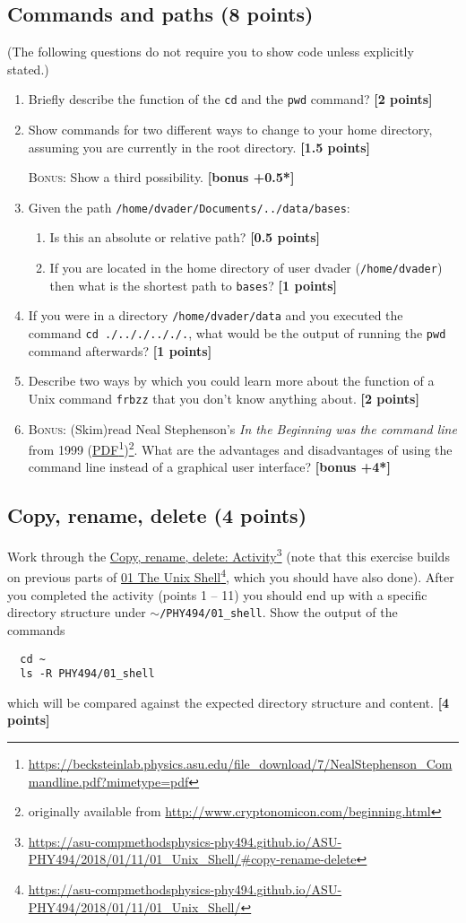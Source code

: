 \documentclass[letterpaper]{scrartcl}
\newcommand{\BONUS}{\textsc{Bonus: }}
\newcommand{\bonus}[1]{\textbf{[bonus +#1*]}}
\newcommand{\points}[1]{\textbf{[#1 points]}}
\newenvironment{enuma}{\begin{enumerate}[label=(\alph*)]}{\end{enumerate}}
\newenvironment{enumi}{\begin{enumerate}[label=(\roman*)]}{\end{enumerate}}
\newcommand{\fnhref}[2]{\href{#1}{#2}\footnote{\url{#1}}}
\begin{document}
\subsection{Commands and paths (8 points)}
(The following questions do not require you to show code unless
explicitly stated.)
\begin{enuma}
\item Briefly describe the function of the \texttt{cd} and the
  \texttt{pwd} command? \points{2}
\item Show commands for two different ways to change to your home directory,
  assuming you are currently in the root directory. \points{1.5}

  \BONUS Show a third possibility. \bonus{0.5}
\item Given the path \texttt{/home/dvader/Documents/../data/bases}:
  \begin{enumi}
    \item Is this an absolute or relative path? \points{0.5}
    \item If you are located in the home directory of user dvader
      (\texttt{/home/dvader}) then what is the shortest path to
      \texttt{bases}? \points{1}
  \end{enumi}
\item If you were in a directory \texttt{/home/dvader/data} and you
  executed the command \texttt{cd ./.././.././.}, what would be the
  output of running the \texttt{pwd} command afterwards? \points{1}
\item Describe two ways by which you could learn more about the
  function of a Unix command \texttt{frbzz} that you don't know
  anything about. \points{2}
\item \BONUS (Skim)read Neal Stephenson's \emph{In the Beginning was
  the command line} from 1999
  (\fnhref{https://becksteinlab.physics.asu.edu/file_download/7/NealStephenson_Commandline.pdf?mimetype=pdf}{PDF})\footnote{originally
  available from
  \url{http://www.cryptonomicon.com/beginning.html}}. What are the
  advantages and disadvantages of using the command line instead of a
  graphical user interface? \bonus{4}
\end{enuma}

\subsection{Copy, rename, delete (4 points)}

Work through the
\fnhref{https://asu-compmethodsphysics-phy494.github.io/ASU-PHY494/2018/01/11/01_Unix_Shell/\#copy-rename-delete}{Copy,
  rename, delete: Activity} (note that this exercise builds on
previous parts of
\fnhref{https://asu-compmethodsphysics-phy494.github.io/ASU-PHY494/2018/01/11/01_Unix_Shell/}{01
  The Unix Shell}, which you should have also done). After you
completed the activity (points 1 -- 11) you should end up with a
specific directory structure under
\texttt{$\sim$/PHY494/01\_shell}. Show the output of the commands
\begin{lstlisting}
  cd ~
  ls -R PHY494/01_shell
\end{lstlisting}
which will be compared against the expected directory structure and
content. \points{4}
\end{document}
